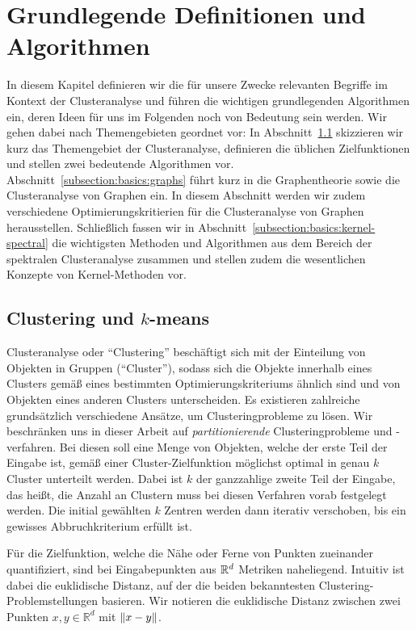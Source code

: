 \section{Grundlegende Definitionen und Algorithmen}
\label{section:basics}

In diesem Kapitel definieren wir die für unsere Zwecke relevanten Begriffe im Kontext der Clusteranalyse und führen die
wichtigen grundlegenden Algorithmen ein, deren Ideen für uns im Folgenden noch von Bedeutung sein werden. Wir gehen dabei
nach Themengebieten geordnet vor: In Abschnitt~\ref{subsection:basics:clustering} skizzieren wir kurz das
Themengebiet der Clusteranalyse, definieren die üblichen Zielfunktionen und stellen zwei bedeutende Algorithmen vor.
Abschnitt~\ref{subsection:basics:graphs} führt kurz in die Graphentheorie sowie die Clusteranalyse von Graphen ein. In diesem
Abschnitt werden wir zudem verschiedene Optimierungskritierien für die
Clusteranalyse von Graphen herausstellen. Schließlich fassen wir in Abschnitt~\ref{subsection:basics:kernel-spectral} die
wichtigsten Methoden und Algorithmen aus dem Bereich der spektralen Clusteranalyse zusammen und stellen zudem die wesentlichen
Konzepte von Kernel-Methoden vor.

\subsection{Clustering und \texorpdfstring{$k$}{k}-means}
\label{subsection:basics:clustering}

Clusteranalyse oder "`Clustering"' beschäftigt sich mit der Einteilung von Objekten in Gruppen ("`Cluster"'), sodass
sich die Objekte innerhalb eines Clusters gemäß eines bestimmten Optimierungskriteriums ähnlich sind und von Objekten eines
anderen Clusters unterscheiden. Es existieren zahlreiche grundsätzlich verschiedene Ansätze, um Clusteringprobleme zu lösen.
Wir beschränken uns in dieser Arbeit auf \emph{partitionierende} Clusteringprobleme und -verfahren. Bei diesen
soll eine Menge von Objekten, welche der erste Teil der Eingabe ist, gemäß einer Cluster-Zielfunktion möglichst
optimal in genau $k$ Cluster unterteilt werden. Dabei ist $k$ der ganzzahlige zweite Teil der Eingabe, das heißt, die
Anzahl an Clustern muss bei diesen Verfahren vorab festgelegt werden. Die initial gewählten $k$ Zentren werden dann iterativ
verschoben, bis ein gewisses Abbruchkriterium erfüllt ist.

Für die Zielfunktion, welche die Nähe oder Ferne von Punkten zueinander quantifiziert, sind bei Eingabepunkten aus
$\mathbb{R}^{d}$ Metriken naheliegend. Intuitiv ist dabei die euklidische Distanz, auf der die beiden bekanntesten
Clustering-Problemstellungen basieren. Wir notieren die euklidische Distanz zwischen zwei Punkten $x, y \in \mathbb{R}^d$ mit
$\lVert {x} - {y} \rVert$.

